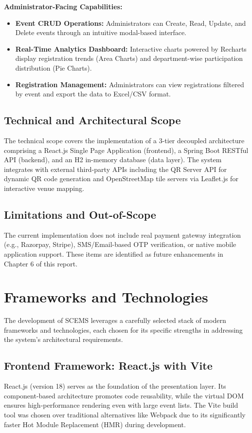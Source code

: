 \documentclass[12pt,a4paper]{report}
\begin{document}
\textbf{Administrator-Facing Capabilities:}
\begin{itemize}
    \item \textbf{Event CRUD Operations:} Administrators can Create, Read, Update, and Delete events through an intuitive modal-based interface.
    \item \textbf{Real-Time Analytics Dashboard:} Interactive charts powered by Recharts display registration trends (Area Charts) and department-wise participation distribution (Pie Charts).
    \item \textbf{Registration Management:} Administrators can view registrations filtered by event and export the data to Excel/CSV format.
\end{itemize}

\subsection{Technical and Architectural Scope}
The technical scope covers the implementation of a 3-tier decoupled architecture comprising a React.js Single Page Application (frontend), a Spring Boot RESTful API (backend), and an H2 in-memory database (data layer). The system integrates with external third-party APIs including the QR Server API for dynamic QR code generation and OpenStreetMap tile servers via Leaflet.js for interactive venue mapping.

\subsection{Limitations and Out-of-Scope}
The current implementation does not include real payment gateway integration (e.g., Razorpay, Stripe), SMS/Email-based OTP verification, or native mobile application support. These items are identified as future enhancements in Chapter 6 of this report.

\section{Frameworks and Technologies}

The development of SCEMS leverages a carefully selected stack of modern frameworks and technologies, each chosen for its specific strengths in addressing the system's architectural requirements.

\subsection{Frontend Framework: React.js with Vite}
React.js (version 18) serves as the foundation of the presentation layer. Its component-based architecture promotes code reusability, while the virtual DOM ensures high-performance rendering even with large event lists. The Vite build tool was chosen over traditional alternatives like Webpack due to its significantly faster Hot Module Replacement (HMR) during development.
\end{document}
